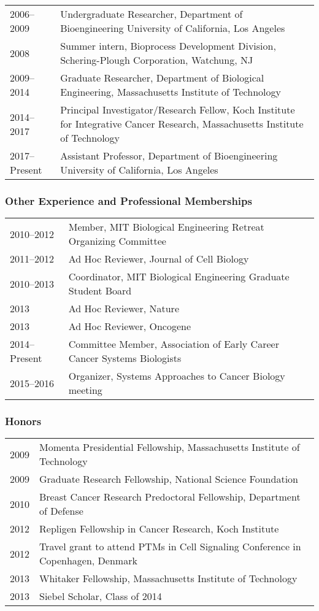 \documentclass[11pt]{article}
\begin{document}
\begin{tabular}{p{1.1in}p{6.1in}}
  2006--2009 & Undergraduate Researcher, Department of Bioengineering
		University of California, Los Angeles\\
  2008 & Summer intern, Bioprocess Development Division, Schering-Plough Corporation, Watchung, NJ \\
  2009--2014 & Graduate Researcher, Department of Biological Engineering, Massachusetts Institute of Technology \\
  2014--2017 & Principal Investigator/Research Fellow, Koch Institute for Integrative Cancer Research, Massachusetts Institute of Technology \\
  2017--Present & Assistant Professor, Department of Bioengineering
		University of California, Los Angeles
\end{tabular}



\subsubsection{Other Experience and Professional Memberships}

\begin{tabular}{p{1.1in}p{6.1in}}
2010--2012 & Member, MIT Biological Engineering Retreat Organizing Committee\\
2011--2012 & Ad Hoc Reviewer, Journal of Cell Biology\\
2010--2013 & Coordinator, MIT Biological Engineering Graduate Student Board\\
2013 & Ad Hoc Reviewer, Nature\\
2013 & Ad Hoc Reviewer, Oncogene\\
2014--Present & Committee Member, Association of Early Career Cancer Systems Biologists\\
2015--2016 & Organizer, Systems Approaches to Cancer Biology meeting\\
\end{tabular}


\subsubsection{Honors}

\begin{tabular}{p{1.1in}p{6.1in}}
 2009 & Momenta Presidential Fellowship, Massachusetts Institute of Technology\\
 2009 & Graduate Research Fellowship, National Science Foundation\\
 2010 & Breast Cancer Research Predoctoral Fellowship, Department of Defense\\
 2012 & Repligen Fellowship in Cancer Research, Koch Institute\\
 2012 & Travel grant to attend PTMs in Cell Signaling Conference in Copenhagen, Denmark\\
 2013 & Whitaker Fellowship, Massachusetts Institute of Technology\\
 2013 & Siebel Scholar, Class of 2014\\	
\end{tabular}
\end{document}
